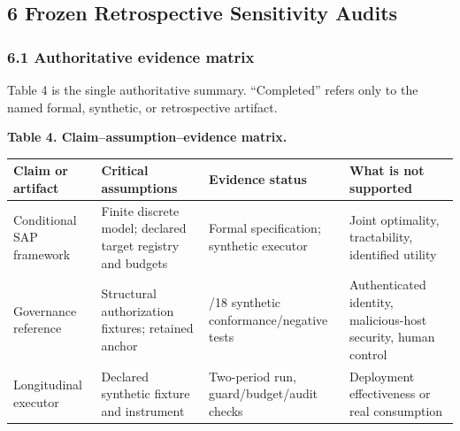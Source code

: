 \documentclass[
  11pt]{article}
\begin{document}
\subsection{6 Frozen Retrospective Sensitivity
Audits}\label{frozen-retrospective-sensitivity-audits}

\subsubsection{6.1 Authoritative evidence
matrix}\label{authoritative-evidence-matrix}

Table 4 is the single authoritative summary. ``Completed'' refers only
to the named formal, synthetic, or retrospective artifact.

\textbf{Table 4. Claim--assumption--evidence matrix.}

\begin{longtable}[]{@{}
  >{\raggedright\arraybackslash}p{}
  >{\raggedright\arraybackslash}p{}
  >{\raggedright\arraybackslash}p{}
  >{\raggedright\arraybackslash}p{}@{}}
\toprule\noalign{}
\begin{minipage}[b]{\linewidth}\raggedright
Claim or artifact
\end{minipage} & \begin{minipage}[b]{\linewidth}\raggedright
Critical assumptions
\end{minipage} & \begin{minipage}[b]{\linewidth}\raggedright
Evidence status
\end{minipage} & \begin{minipage}[b]{\linewidth}\raggedright
What is not supported
\end{minipage} \\
\midrule\noalign{}
\endhead
\bottomrule\noalign{}
\endlastfoot
Conditional SAP framework & Finite discrete model; declared target
registry and budgets & Formal specification; synthetic executor & Joint
optimality, tractability, identified utility \\
Governance reference & Structural authorization fixtures; retained
anchor & 18/18 synthetic conformance/negative tests & Authenticated
identity, malicious-host security, human control \\
Longitudinal executor & Declared synthetic fixture and instrument &
Two-period run, guard/budget/audit checks & Deployment effectiveness or
real consumption \\

\end{longtable}
\end{document}
